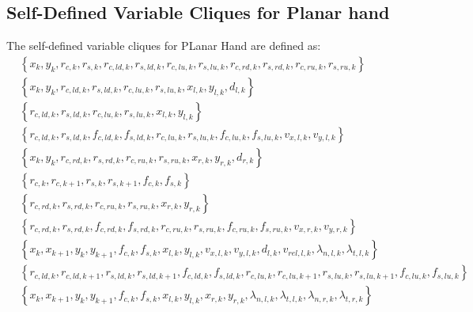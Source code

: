 \subsection{Self-Defined Variable Cliques for Planar hand}
\label{app:sec:self-cliques}

The self-defined variable cliques for PLanar Hand are defined as:
\begin{subequations}
    \label{eq:exp:planar-hand-cliques}
    \begin{align}
        & \left\{ x_{k}, y_{k}, r_{c, k}, r_{s, k}, r_{c, ld, k}, r_{s, ld, k}, r_{c, lu, k}, r_{s, lu, k}, r_{c, rd, k}, r_{s, rd, k}, r_{c, ru, k}, r_{s, ru, k} \right\} \\ 
        & \left\{ x_{k}, y_{k}, r_{c, ld, k}, r_{s, ld, k}, r_{c, lu, k}, r_{s, lu, k}, x_{l, k}, y_{l, k}, d_{l, k} \right\} \\ 
        & \left\{ r_{c, ld, k}, r_{s, ld, k}, r_{c, lu, k}, r_{s, lu, k}, x_{l, k}, y_{l, k} \right\} \\ 
        & \left\{ r_{c, ld, k}, r_{s, ld, k}, f_{c, ld, k}, f_{s, ld, k}, r_{c, lu, k}, r_{s, lu, k}, f_{c, lu, k}, f_{s, lu, k}, v_{x, l, k}, v_{y, l, k} \right\} \\ 
        & \left\{ x_{k}, y_{k}, r_{c, rd, k}, r_{s, rd, k}, r_{c, ru, k}, r_{s, ru, k}, x_{r, k}, y_{r, k}, d_{r, k} \right\} \\ 
        & \left\{ r_{c, k}, r_{c, k+1}, r_{s, k}, r_{s, k+1}, f_{c, k}, f_{s, k} \right\} \\ 
        & \left\{ r_{c, rd, k}, r_{s, rd, k}, r_{c, ru, k}, r_{s, ru, k}, x_{r, k}, y_{r, k} \right\} \\ 
        & \left\{ r_{c, rd, k}, r_{s, rd, k}, f_{c, rd, k}, f_{s, rd, k}, r_{c, ru, k}, r_{s, ru, k}, f_{c, ru, k}, f_{s, ru, k}, v_{x, r, k}, v_{y, r, k}  \right\}\\ 
        & \left\{ x_{k}, x_{k+1}, y_{k}, y_{k+1}, f_{c, k}, f_{s, k}, x_{l, k}, y_{l, k}, v_{x, l, k}, v_{y, l, k}, d_{l, k}, v_{rel, l, k}, \lambda_{n, l, k}, \lambda_{t, l, k} \right\} \\ 
        & \left\{ r_{c, ld, k}, r_{c, ld, k+1}, r_{s, ld, k}, r_{s, ld, k+1}, f_{c, ld, k}, f_{s, ld, k}, r_{c, lu, k}, r_{c, lu, k+1}, r_{s, lu, k}, r_{s, lu, k+1}, f_{c, lu, k}, f_{s, lu, k} \right\} \\ 
        & \left\{ x_{k}, x_{k+1}, y_{k}, y_{k+1}, f_{c, k}, f_{s, k}, x_{l, k}, y_{l, k}, x_{r, k}, y_{r, k}, \lambda_{n, l, k}, \lambda_{t, l, k}, \lambda_{n, r, k}, \lambda_{t, r, k} \right\} \\ 

\end{align}
\end{subequations}
